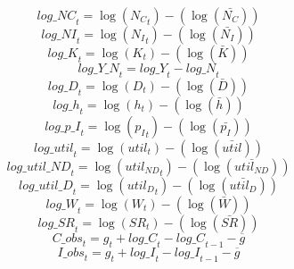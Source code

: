 \begin{dmath}
{log\_NC}_{t}=\log\left({{N_C}}_{t}\right)-(\log\left(\bar{{N_C}}\right))
\end{dmath}
\begin{dmath}
{log\_NI}_{t}=\log\left({{N_I}}_{t}\right)-(\log\left(\bar{{N_I}}\right))
\end{dmath}
\begin{dmath}
{log\_K}_{t}=\log\left({{K}}_{t}\right)-(\log\left(\bar{{K}}\right))
\end{dmath}
\begin{dmath}
{log\_Y\_N}_{t}={log\_Y}_{t}-{log\_N}_{t}
\end{dmath}
\begin{dmath}
{log\_D}_{t}=\log\left({{D}}_{t}\right)-(\log\left(\bar{{D}}\right))
\end{dmath}
\begin{dmath}
{log\_h}_{t}=\log\left({h}_{t}\right)-(\log\left(\bar{h}\right))
\end{dmath}
\begin{dmath}
{log\_p\_I}_{t}=\log\left({{p_I}}_{t}\right)-(\log\left(\bar{{p_I}}\right))
\end{dmath}
\begin{dmath}
{log\_util}_{t}=\log\left({{util}}_{t}\right)-(\log\left(\bar{{util}}\right))
\end{dmath}
\begin{dmath}
{log\_util\_ND}_{t}=\log\left({{util_{ND}}}_{t}\right)-(\log\left(\bar{{util_{ND}}}\right))
\end{dmath}
\begin{dmath}
{log\_util\_D}_{t}=\log\left({{util_D}}_{t}\right)-(\log\left(\bar{{util_D}}\right))
\end{dmath}
\begin{dmath}
{log\_W}_{t}=\log\left({{W}}_{t}\right)-(\log\left(\bar{{W}}\right))
\end{dmath}
\begin{dmath}
{log\_SR}_{t}=\log\left({{SR}}_{t}\right)-(\log\left(\bar{{SR}}\right))
\end{dmath}
\begin{dmath}
{C\_obs}_{t}={{g}}_{t}+{log\_C}_{t}-{log\_C}_{t-1}-{{\overline{g}}}
\end{dmath}
\begin{dmath}
{I\_obs}_{t}={{g}}_{t}+{log\_I}_{t}-{log\_I}_{t-1}-{{\overline{g}}}
\end{dmath}

